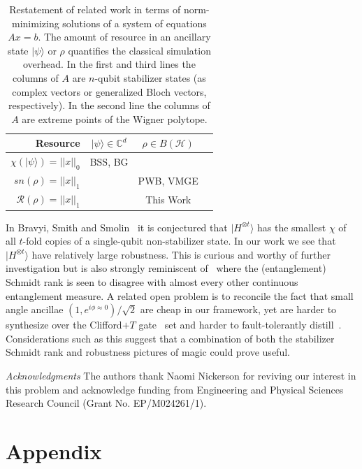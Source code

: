 \documentclass[aps,prl,twocolumn,showpacs,superscriptaddress,groupedaddress,amsmath,amssymb]{revtex4-1}  %
\def\ket #1{\vert #1\rangle}
\begin{document}
\begin{table}[h]
\centering
\begin{tabular}{rccc}
\hline
Resource & $\ket{\psi}\in \mathbb{C}^{d}$ & $\rho\in B(\mathcal{H})$\\
\hline
$\chi(\ket{\psi})=||x||_0$  & BSS\cite{bravyi_trading_2016}, BG\cite{bravyi_improved_2016} \\
$sn(\rho)=||x||_1$   & & PWB\cite{pashayan_estimating_2015}, VMGE\cite{veitch_resource_2014} \\
$\mathcal{R}(\rho)=||x||_1$  & & This Work\\
\hline
\end{tabular}
\caption{\label{Tab:Other_work} Restatement of related work in terms of norm-minimizing solutions of a system of equations $Ax=b$. The amount of resource in an ancillary state $\ket{\psi}$ or $\rho$ quantifies the classical simulation overhead. In the first and third lines the columns of $A$ are $n$-qubit stabilizer states (as complex vectors or generalized Bloch vectors, respectively). In the second line the columns of $A$ are extreme points of the Wigner polytope.}
\end{table}

In Bravyi, Smith and Smolin~\cite{bravyi_trading_2016} it is conjectured that $\ket{H^{\otimes t}}$ has the smallest $\chi$ of all $t$-fold copies of a single-qubit non-stabilizer state. In our work we see that $\ket{H^{\otimes t}}$ have relatively large robustness. This is curious and worthy of further investigation but is also strongly reminiscent of~\cite{van_den_nest_universal_2013} where the (entanglement) Schmidt rank is seen to disagree with almost every other continuous entanglement measure. A related open problem is to reconcile the fact that small angle ancillae $(1,e^{i\phi\approx 0})/\sqrt{2}$ are cheap in our framework, yet are harder to synthesize over the Clifford$+T$ gate~\cite{ross_optimal_2014} set and harder to fault-tolerantly distill~\cite{duclos-cianci_distillation_2013,campbell_efficient_2016}. Considerations such as this suggest that a combination of both the stabilizer Schmidt rank and robustness pictures of magic could prove useful. 


\noindent\textit{Acknowledgments}
The authors thank Naomi Nickerson for reviving our
interest in this problem and acknowledge funding from
Engineering and Physical Sciences Research Council
(Grant No. EP/M024261/1).




\section{Appendix}
\end{document}
